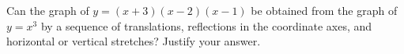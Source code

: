 Can the graph of $y=(x+3)(x-2)(x-1)$ be obtained from the graph of $y=x^3$ by a sequence of translations, reflections in the coordinate axes, and horizontal or vertical stretches? Justify your answer.
